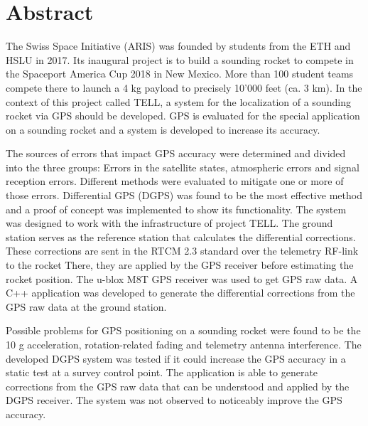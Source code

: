 \chapter*{Abstract}

The Swiss Space Initiative (ARIS) was founded by students from the ETH and HSLU in 2017.
Its inaugural project is to build a sounding rocket to compete in the Spaceport America Cup 2018 in New Mexico.
More than 100 student teams compete there to launch a 4 kg payload to precisely 10'000 feet (ca. 3 km).
In the context of this project called TELL, a system for the localization of a sounding rocket via GPS should be developed.
GPS is evaluated for the special application on a sounding rocket and a system is developed to increase its accuracy.

The sources of errors that impact GPS accuracy were determined and divided into the three groups: Errors in the satellite states, atmospheric errors and signal reception errors.
Different methods were evaluated to mitigate one or more of those errors.
Differential GPS (DGPS) was found to be the most effective method and a proof of concept was implemented to show its functionality.
The system was designed to work with the infrastructure of project TELL.
The ground station serves as the reference station that calculates the differential corrections.
These corrections are sent in the RTCM 2.3 standard over the telemetry RF-link to the rocket
There, they are applied by the GPS receiver before estimating the rocket position.
The u-blox M8T GPS receiver was used to get GPS raw data.
A C++ application was developed to generate the differential corrections from the GPS raw data at the ground station.

Possible problems for GPS positioning on a sounding rocket were found to be the 10 g acceleration, rotation-related fading and telemetry antenna interference.
The developed DGPS system was tested if it could increase the GPS accuracy in a static test at a survey control point.
The application is able to generate corrections from the GPS raw data that can be understood and applied by the DGPS receiver.
The system was not observed to noticeably improve the GPS accuracy.